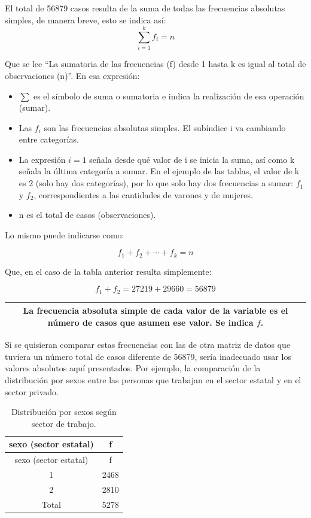 \documentclass[]{book}
\begin{document}
El total de 56879 casos resulta de la suma de todas las frecuencias absolutas simples, de manera breve, esto se indica así: \[\sum_{i=1}^{k}f_i =n\]

Que se lee ``La sumatoria de las frecuencias (f) desde 1 hasta k es igual al total de observaciones (n)''.
En esa expresión:

\begin{itemize}
\item
  \(\sum\) es el símbolo de suma o sumatoria e indica la realización de esa operación (sumar).
\item
  Las \(f_i\) son las frecuencias absolutas simples. El subíndice i va cambiando entre categorías.
\item
  La expresión \(i=1\) señala desde qué valor de i se inicia la suma, así como k señala la última categoría a sumar. En el ejemplo de las tablas, el valor de k es 2 (solo hay dos categorías), por lo que solo hay dos frecuencias a sumar: \(f_1\) y \(f_2\), correspondientes a las cantidades de varones y de mujeres.
\item
  n es el total de casos (observaciones).
\end{itemize}

Lo mismo puede indicarse como:

\[f_1 + f_2 + ⋯ + f_k = n\]

Que, en el caso de la tabla anterior resulta simplemente:

\[f_1 + f_2 = 27219 + 29660 = 56879\]

\begin{longtable}[]{@{}c@{}}
\toprule
\endhead
\begin{minipage}[t]{0.97\columnwidth}\centering
La \textbf{frecuencia absoluta simple} de cada valor de la variable es el número de casos que asumen ese valor. Se indica \(f\).\strut
\end{minipage}\tabularnewline
\bottomrule
\end{longtable}

Si se quisieran comparar estas frecuencias con las de otra matriz de datos que tuviera un número total de casos diferente de 56879, sería inadecuado usar los valores absolutos aquí presentados. Por ejemplo, la comparación de la distribución por sexos entre las personas que trabajan en el sector estatal y en el sector privado.

\begin{longtable}[]{@{}cc@{}}
\caption{\label{tab:unnamed-chunk-22}Distribución por sexos según sector de trabajo.}\tabularnewline
\toprule
sexo (sector estatal) & f\tabularnewline
\midrule
\endfirsthead
\toprule
sexo (sector estatal) & f\tabularnewline
\midrule
\endhead
1 & 2468\tabularnewline
2 & 2810\tabularnewline
Total & 5278\tabularnewline
\bottomrule
\end{longtable}
\end{document}
